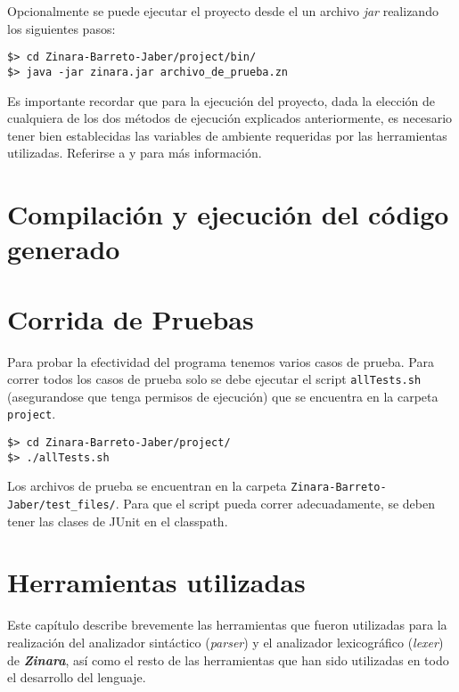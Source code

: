 \documentclass[12pt, spanish]{report}
\begin{document}
Opcionalmente se puede ejecutar el proyecto desde el un archivo
\emph{jar} realizando los siguientes pasos:

\begin{verbatim}
$> cd Zinara-Barreto-Jaber/project/bin/
$> java -jar zinara.jar archivo_de_prueba.zn
\end{verbatim}


Es importante recordar que para la ejecuci\'on del proyecto, dada la
elecci\'on de cualquiera de los dos m\'etodos de ejecuci\'on explicados
anteriormente, es necesario tener bien establecidas las variables de
ambiente requeridas por las herramientas utilizadas. Referirse a
\cite{javacup} y \cite{jflex} para m\'as informaci\'on.

\chapter{Compilaci\'on y ejecuci\'on del c\'odigo generado}

\chapter{Corrida de Pruebas}
\label{sec:pruebas}
Para probar la efectividad del programa tenemos varios casos de
prueba. Para correr todos los casos de prueba solo se debe ejecutar el
script \texttt{allTests.sh} (asegurandose que tenga permisos de
ejecuci\'on) que se encuentra en la carpeta \texttt{project}.

\begin{verbatim}
$> cd Zinara-Barreto-Jaber/project/
$> ./allTests.sh
\end{verbatim}

Los archivos de prueba se encuentran en la carpeta
\texttt{Zinara-Barreto-Jaber/test\_files/}.
Para que el script pueda correr adecuadamente, se deben tener las clases
de JUnit en el classpath.

\chapter{Herramientas utilizadas}
\label{sec:herramientas}
Este cap\'itulo describe brevemente las herramientas que fueron
utilizadas para la realizaci\'on del analizador sint\'actico
(\emph{parser}) y el analizador lexicogr\'afico (\emph{lexer}) de
\emph{\textbf{Zinara}}, as\'i como el resto de las herramientas que han
sido utilizadas en todo el desarrollo del lenguaje.
\end{document}

